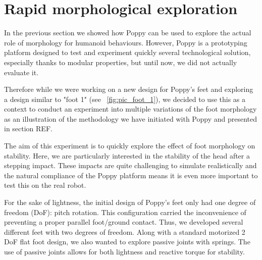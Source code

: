 
\newpage
\section{Rapid morphological exploration} %
\label{sec:morphology-variable}

In the previous section we showed how Poppy can be used to explore the actual role of morphology for humanoid behaviours. However, Poppy is a prototyping platform designed to test and experiment quickly several technological solution, especially thanks to modular properties, but until now, we did not actually evaluate it.

Therefore while we were working on a new design for Poppy's feet and exploring a design similar to "foot 1" (see \figurename~\ref{fig:pic_foot_1}), we decided to use this as a context to conduct an experiment into multiple variations of the foot morphology as an illustration of the methodology we have initiated with Poppy and presented in section REF.


The aim of this experiment is to quickly explore the effect of foot morphology on stability. Here, we are particularly interested in the stability of the head after a stepping impact. These impacts are quite challenging to simulate realistically and the natural compliance of the Poppy platform means it is even more important to test this on the real robot.

For the sake of lightness, the initial design of Poppy's feet only had one degree of freedom (DoF): pitch rotation. This configuration carried the inconvenience of preventing a proper parallel foot/ground contact. Thus, we developed several different feet with two degrees of freedom. Along with a standard motorized 2 DoF flat foot design, we also wanted to explore passive joints with springs. The use of passive joints allows for both lightness and reactive torque for stability.


\begin{figure}[p]
\centering
    \hfil
    \\
    \hfil


    \caption{}
    \label{fig:foot_variants}
\end{figure}


